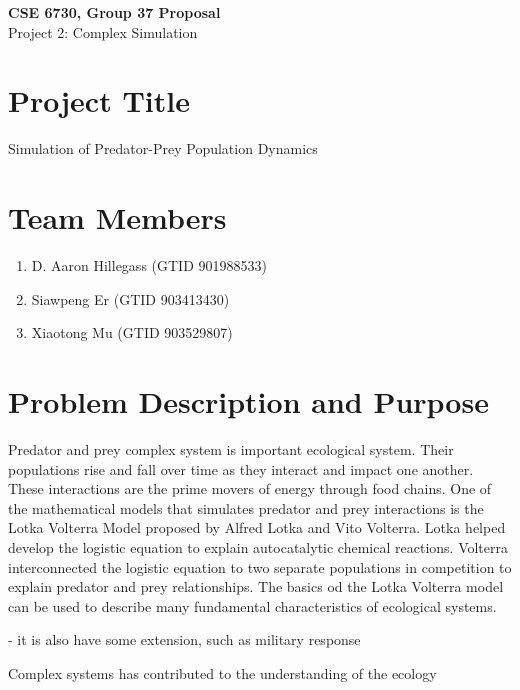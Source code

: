 \documentclass{article}
\begin{document}
	\begin{center}
		
		\LARGE{\textbf{CSE 6730, Group 37 Proposal}} \\
		\vspace{1em}
		\Large{Project 2: Complex Simulation} \\
		
	\end{center}
	\begin{normalsize}
		
		\section{Project Title}
		
		Simulation of Predator-Prey Population Dynamics
		
		\section{Team Members}
		
		\begin{enumerate}
			\item D. Aaron Hillegass (GTID 901988533)
			\item Siawpeng Er (GTID 903413430)
			\item Xiaotong Mu (GTID 903529807)
		\end{enumerate}
		
		\section{Problem Description and Purpose}
		Predator and prey complex system is important ecological system. Their populations rise and fall over time as they interact and impact one another. These interactions are the prime movers of energy through food chains. One of the mathematical models that simulates predator and prey interactions is the Lotka Volterra Model proposed by Alfred Lotka and Vito Volterra. Lotka helped develop the logistic equation to explain autocatalytic chemical reactions. Volterra interconnected the logistic equation to two separate populations in competition to explain predator and prey relationships. The basics od the Lotka Volterra model can be used to describe many fundamental characteristics of ecological systems.
		
		- it is also have some extension, such as military response
		
		Complex systems has contributed to the understanding of the ecology
		

\end{normalsize}
\end{document}
